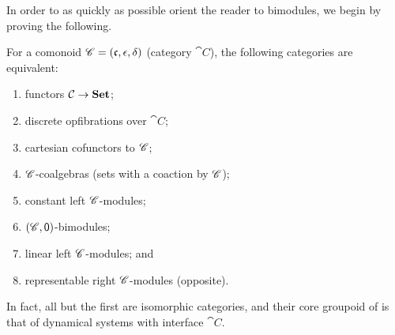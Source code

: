 \documentclass[DynamicalBook]{subfiles}
\begin{document}
In order to as quickly as possible orient the reader to bimodules, we begin by proving the following.

\begin{theorem}\label{thm.tfae_c_sets}
For a comonoid $\mathscr{C}=(\mathfrak{c},\epsilon,\delta)$ (category $\cat{C}$), the following categories are equivalent:
\begin{enumerate}
	\item functors $\mathcal{C}\to\textbf{Set}$;
	\item discrete opfibrations over $\cat{C}$;
	\item cartesian cofunctors to $\mathscr{C}$;
	\item $\mathscr{C}$-coalgebras (sets with a coaction by $\mathscr{C}$);
	\item constant left $\mathscr{C}$-modules;
	\item $(\mathscr{C},\textsf{0})$-bimodules;
	\item linear left $\mathscr{C}$-modules; and
	\item representable right $\mathscr{C}$-modules (opposite).
\end{enumerate}
In fact, all but the first are isomorphic categories, and their core groupoid of is that of dynamical systems with interface $\cat{C}$.
\end{theorem}
\end{document}
